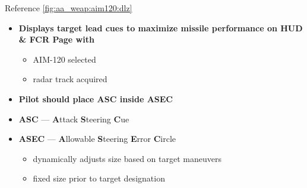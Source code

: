 \begin{tcoloritemize}
\begin{itemize}
\begin{itemize}
        \end{itemize}
    \end{itemize}
    Reference \cref{fig:aa_weap:aim120:dlz}
    \begin{itemize}
        \item \textbf{Displays target lead cues to maximize missile performance on HUD \& FCR Page with}
        \begin{itemize}
            \item AIM-120 selected
            \item radar track acquired
        \end{itemize}
        \item \textbf{Pilot should place ASC inside ASEC}
        \item \textbf{ASC} --- \textbf{A}ttack \textbf{S}teering \textbf{C}ue
        \item \textbf{ASEC} --- \textbf{A}llowable \textbf{S}teering \textbf{E}rror \textbf{C}ircle
        \begin{itemize}
            \item dynamically adjusts size based on target maneuvers
            \item fixed size prior to target designation
        \end{itemize}
    \end{itemize}
\end{tcoloritemize}


